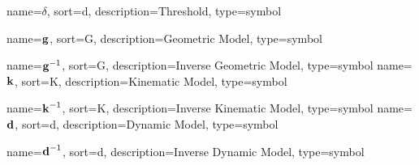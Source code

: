 	{%
		name={\ensuremath{\delta}},
		sort=d,
		description=Threshold,
		type=symbol
	}
	\newcommand{\threshold}{\gls{sym:threshold}}

	{%
		name={\ensuremath{\vecfunc{g}}},
		sort=G,
		description=Geometric Model,
		type=symbol
	}
	\newcommand{\geometricmodel}{\gls{sym:geometricmodel}}

	{%
		name={\ensuremath{{\vecfunc{g}^{-1}}}},
		sort=G,
		description=Inverse Geometric Model,
		type=symbol
	}
	\newcommand{\invgeometricmodel}{\gls{sym:invgeometricmodel}}
	{%
		name={\ensuremath{\vecfunc{k}}},
		sort=K,
		description=Kinematic Model,
		type=symbol
	}
	\newcommand{\kinematicmodel}{\gls{sym:kinematicmodel}}

	{%
		name={\ensuremath{{\vecfunc{k}^{-1}}}},
		sort=K,
		description=Inverse Kinematic Model,
		type=symbol
	}
	\newcommand{\invkinematicmodel}{\gls{sym:invkinematicmodel}}
	{%
		name={\ensuremath{\vecfunc{d}}},
		sort=d,
		description=Dynamic Model,
		type=symbol
	}
	\newcommand{\dynamicmodel}{\gls{sym:dynamicmodel}}

	{%
		name={\ensuremath{{\vecfunc{d}^{-1}}}},
		sort=d,
		description=Inverse Dynamic Model,
		type=symbol
	}
	\newcommand{\invdynamicmodel}{\gls{sym:invdynamicmodel}}


